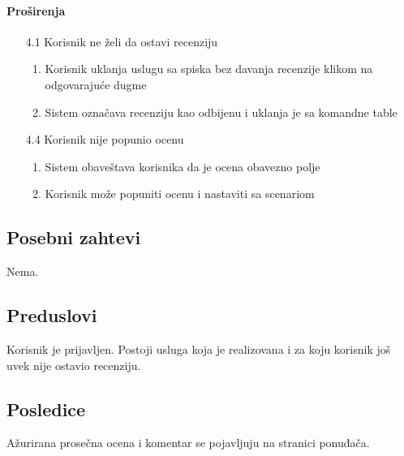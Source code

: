 \documentclass[a4paper,12pt]{report}
\begin{document}
			\paragraph*{Proširenja}
				\begin{enumerate}
					\item[4.1] Korisnik ne želi da ostavi recenziju
						\begin{enumerate}[noitemsep,topsep=-8pt]
							\item Korisnik uklanja uslugu sa spiska bez davanja recenzije klikom na odgovarajuće dugme
							\item Sistem označava recenziju kao odbijenu i uklanja je sa komandne table
						\end{enumerate}
					\item[4.4] Korisnik nije popunio ocenu
						\begin{enumerate}[noitemsep,topsep=-8pt]
							\item Sistem obaveštava korisnika da je ocena obavezno polje
							\item Korisnik može popuniti ocenu i nastaviti sa scenariom
						\end{enumerate}
				\end{enumerate}
		\subsection{Posebni zahtevi}
			Nema.
		\subsection{Preduslovi}
			Korisnik je prijavljen. Postoji usluga koja je realizovana i za koju korisnik još uvek nije ostavio recenziju.
		\subsection{Posledice}
			Ažurirana prosečna ocena i komentar se pojavljuju na stranici ponuđača.
\end{document}
